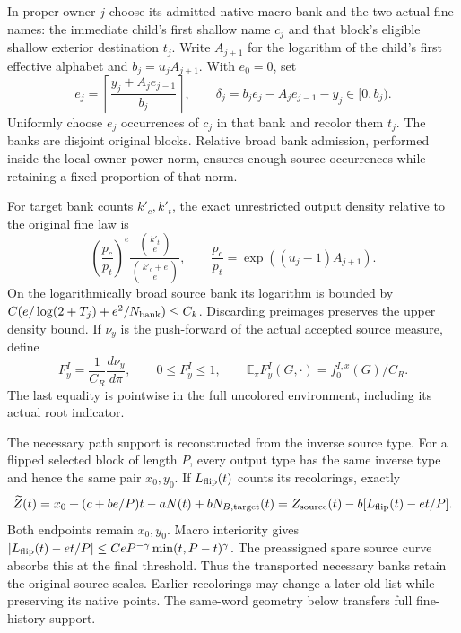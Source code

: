 In proper owner $j$ choose its admitted native macro bank and the two
actual fine names: the immediate child's first shallow name $c_j$
and that block's eligible shallow exterior destination $t_j$.
Write $A_{j+1}$ for the logarithm of the child's first effective
alphabet and $b_j=u_jA_{j+1}$.  With $e_0=0$, set
\begin{equation}
 e_j=\left\lceil\frac{y_j+A_je_{j-1}}{b_j}\right\rceil,
 \qquad \delta_j=b_je_j-A_je_{j-1}-y_j\in[0,b_j).
 \label{lower:triangular}
\end{equation}
Uniformly choose $e_j$ occurrences of $c_j$ in that bank and recolor
them $t_j$.  The banks are disjoint original blocks.  Relative broad
bank admission, performed inside the local owner-power norm, ensures
enough source occurrences while retaining a fixed proportion of that norm.

For target bank counts $k'_c,k'_t$, the exact unrestricted output
density relative to the original fine law is
\begin{equation}
 \left(\frac{p_c}{p_t}\right)^{e}
       \frac{\binom{k'_t}{e}}{\binom{k'_c+e}{e}},
 \qquad \frac{p_c}{p_t}=\exp((u_j-1)A_{j+1}).
 \label{lower:transport-density}
\end{equation}
On the logarithmically broad source bank its logarithm is bounded by
$C(e/\log(2+T_j)+e^2/N_{\rm bank})\leq C_k$.
Discarding preimages preserves the upper density bound.  If $\nu_y$
is the push-forward of the actual accepted source measure, define
\begin{equation}
 F_y^I=\frac1{C_R}\frac{d\nu_y}{d\pi},\qquad
 0\leq F_y^I\leq1,\qquad
 \mathbb E_\pi F_y^I(G,\cdot)=f_0^{I,x}(G)/C_R.
 \label{lower:literal-density}
\end{equation}
The last equality is pointwise in the full uncolored environment,
including its actual root indicator.

The necessary path support is reconstructed from the inverse source
type.  For a flipped selected block of length $P$, every output type
has the same inverse type and hence the same pair $x_0,y_0$.
If $L_{\rm flip}(t)$ counts its recolorings, exactly
\begin{equation}
 \widetilde Z(t)=x_0+(c+be/P)t-aN(t)+bN_{B,\rm target}(t)
              =Z_{\rm source}(t)-b[L_{\rm flip}(t)-et/P].
 \label{lower:reconstructed}
\end{equation}
Both endpoints remain $x_0,y_0$.  Macro interiority gives
$|L_{\rm flip}(t)-et/P|\leq CeP^{-\gamma}\min(t,P-t)^\gamma$.
The preassigned spare source curve absorbs this at the final threshold.
Thus the transported necessary banks retain the original source scales.
Earlier recolorings may change a later old list while preserving its
native points.  The same-word geometry below transfers full fine-history
support.

